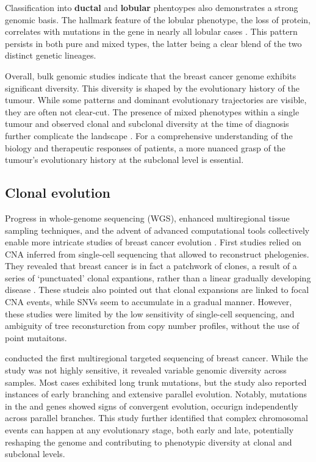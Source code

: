 Classification into \textbf{ductal} and \textbf{lobular} phentoypes also demonstrates a strong genomic basis. The hallmark feature of the lobular phenotype, the loss of  protein, correlates with mutations in the  gene in nearly all lobular cases \parencite{Ciriello2015-ey}. This pattern persists in both pure and mixed types, the latter being a clear blend of the two distinct genetic lineages.

Overall, bulk genomic studies indicate that the breast cancer genome exhibits significant diversity. This diversity is shaped by the evolutionary history of the tumour. While some patterns and dominant evolutionary trajectories are visible, they are often not clear-cut. The presence of mixed phenotypes within a single tumour and observed clonal and subclonal diversity at the time of diagnosis further complicate the landscape \parencite{Ciriello2015-ey,Pereira2016-ov,Shah2012-xz}. For a comprehensive understanding of the biology and therapeutic responses of patients, a more nuanced grasp of the tumour's evolutionary history at the subclonal level is essential.

\subsection{Clonal evolution}

Progress in whole-genome sequencing (WGS), enhanced multiregional tissue sampling techniques, and the advent of advanced computational tools collectively enable more intricate studies of breast cancer evolution . First studies relied on \ac{CNA} inferred from single-cell sequencing that allowed to reconstruct phelogenies. They revealed that breast cancer is in fact a patchwork of clones, a result of a series of `punctuated' clonal expantions, rather than a linear gradually developing disease \parencite{Navin2011-qq,Wang2014-bp,Gao2016-qv}. These studeis also pointed out that clonal expansions are linked to focal \ac{CNA} events, while \acp{SNV} seem to accumulate in a gradual manner. However, these studies were limited by the low sensitivity of single-cell sequencing, and ambiguity of tree reconsturction from copy number profiles, without the use of point mutaitons.

\textcite{Yates2015-xk} conducted the first multiregional targeted sequencing of breast cancer. While the study was not highly sensitive, it revealed variable genomic diversity across samples. Most cases exhibited long trunk mutations, but the study also reported instances of early branching and extensive parallel evolution. Notably, mutations in the  and  genes showed signs of convergent evolution, occurign independently across parallel branches. This study further identified that complex chromosomal events can happen at any evolutionary stage, both early and late, potentially reshaping the genome and contributing to phenotypic diversity at clonal and subclonal levels.

